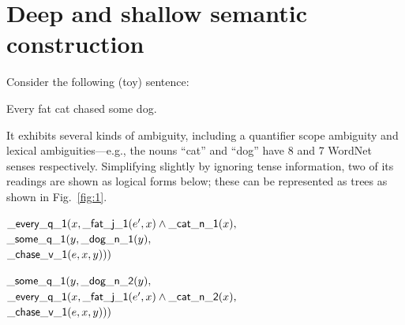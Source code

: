 \section{Deep and shallow semantic construction}
\label{sec:motivation}

Consider the
following (toy) sentence:

\begin{examples}
  \item Every fat cat chased some dog.
\end{examples}

It exhibits several kinds of ambiguity, including a quantifier scope
ambiguity and lexical
ambiguities---e.g., the nouns ``cat'' and ``dog'' have 8 and 7
WordNet senses respectively.  Simplifying slightly by ignoring tense
information, two of its readings are shown as logical forms below;
these can be represented as trees as shown in Fig.~\ref{fig:1}.

\begin{examples}
\item $\mathsf{\_every\_q\_1}(x, \mathsf{\_fat\_j\_1}(e',x) \wedge
    \mathsf{\_cat\_n\_1}(x),$\\
\hspace*{0.1in} $\mathsf{\_some\_q\_1}(y, \mathsf{\_dog\_n\_1}(y),$\\
\hspace*{0.2in}$\mathsf{\_chase\_v\_1}(e,x,y)))$
\label{ex:fat-cat-1}
\item $\mathsf{\_some\_q\_1}(y, \mathsf{\_dog\_n\_2}(y),$\\
\hspace*{0.1in}$\mathsf{\_every\_q\_1}(x, \mathsf{\_fat\_j\_1}(e',x) \wedge
    \mathsf{\_cat\_n\_2}(x), $\\
\hspace*{0.2in}$\mathsf{\_chase\_v\_1}(e,x,y)))$
\label{ex:fat-cat-2}
\end{examples}


